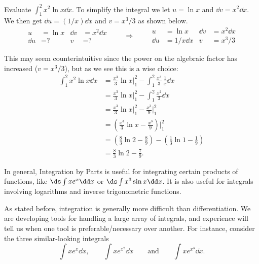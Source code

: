 \begin{example}\label{ex_ibp7}
Evaluate $\displaystyle \int_1^2 x^2 \ln x\dd x$.
\solution
To simplify the integral we let $u=\ln x$ and $\dd v =x^2\dd x$. 
We then get $\dd u = (1/x)\dd x$ and $v=x^3/3$ as shown below.
\[
\begin{aligned}
u&= \ln x & \dd v&=x^2\dd x\\
\dd u&= \text{?} & v&=\text{?}
\end{aligned}
\qquad\Rightarrow\qquad
\begin{aligned}
u&= \ln x& \dd v&=x^2\dd x\\
\dd u&= 1/x\dd x & v&=x^3/3
\end{aligned}
\]

This may seem counterintuitive since the power on the algebraic factor has increased ($v=x^3/3$), but as we see this is a wise choice:
\begin{align*}
	\int_1^2 x^2 \ln x\dd x
	&= \frac{x^3}3\ln x\bigg|_1^2 - \int_1^2 \frac{x^3}{3}\,\frac 1x\dd x \\
	&=  \frac{x^3}3\ln x\bigg|_1^2 - \int_1^2 \frac{x^2}{3}\dd x \\
	&=  \frac{x^3}3\ln x\bigg|_1^2 - \frac{x^3}{9}\bigg|_1^2\\
	&=  \left(\frac{x^3}3\ln x - \frac{x^3}{9}\right)\bigg|_1^2\\
	&=	\left(\frac83\ln 2 - \frac89\right)-\left(\frac13\ln 1 - \frac19\right) \\
	&= \frac83\ln 2 - \frac79. %
\end{align*}
\end{example}

In general, Integration by Parts is useful for integrating certain products of functions, like $\ds\int x e^x\dd x$ or $\ds\int x^3\sin x\dd x$.   It is also useful for integrals involving logarithms and inverse trigonometric functions.

As stated before, integration is generally more difficult than differentiation. We are developing tools for handling a large array of integrals, and experience will tell us when one tool is preferable/necessary over another. For instance, consider the three similar-looking integrals 
\[
\int xe^x\dd x, \qquad  \int x e^{x^2}\dd x \qquad \text{and} \qquad \int xe^{x^3}\dd x.
\]


